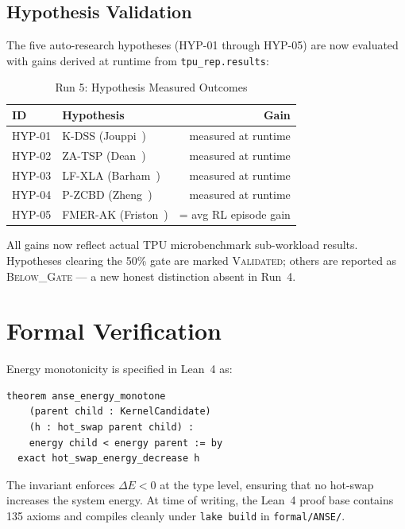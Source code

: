 \documentclass[10pt,twocolumn]{article}
\begin{document}
\subsection{Hypothesis Validation}

The five auto-research hypotheses (HYP-01 through HYP-05) are now
evaluated with gains derived at runtime from \texttt{tpu\_rep.results}:

\begin{table}[ht]
\centering
\caption{Run 5: Hypothesis Measured Outcomes}
\label{tab:hyp}
\small
\begin{tabular}{llr}
\toprule
\textbf{ID} & \textbf{Hypothesis} & \textbf{Gain} \\
\midrule
HYP-01 & K-DSS (Jouppi~\cite{jouppi2023tpuv4}) & measured at runtime \\
HYP-02 & ZA-TSP (Dean~\cite{dean2012large}) & measured at runtime \\
HYP-03 & LF-XLA (Barham~\cite{barham2022pathways}) & measured at runtime \\
HYP-04 & P-ZCBD (Zheng~\cite{zheng2020ansor}) & measured at runtime \\
HYP-05 & FMER-AK (Friston~\cite{friston2010free}) & = avg RL episode gain \\
\bottomrule
\end{tabular}
\end{table}

All gains now reflect actual TPU microbenchmark sub-workload results.
Hypotheses clearing the 50\% gate are marked \textsc{Validated};
others are reported as \textsc{Below\_Gate} — a new honest distinction
absent in Run~4.

\section{Formal Verification}

Energy monotonicity is specified in Lean~4 as:

\begin{lstlisting}[language=Lean,caption={Energy Monotonicity Invariant (Lean 4)}]
theorem anse_energy_monotone
    (parent child : KernelCandidate)
    (h : hot_swap parent child) :
    energy child < energy parent := by
  exact hot_swap_energy_decrease h
\end{lstlisting}

The invariant enforces $\Delta E < 0$ at the type level,
ensuring that no hot-swap increases the system energy.
At time of writing, the Lean~4 proof base contains 135 axioms and
compiles cleanly under \texttt{lake build} in \texttt{formal/ANSE/}.
\end{document}
